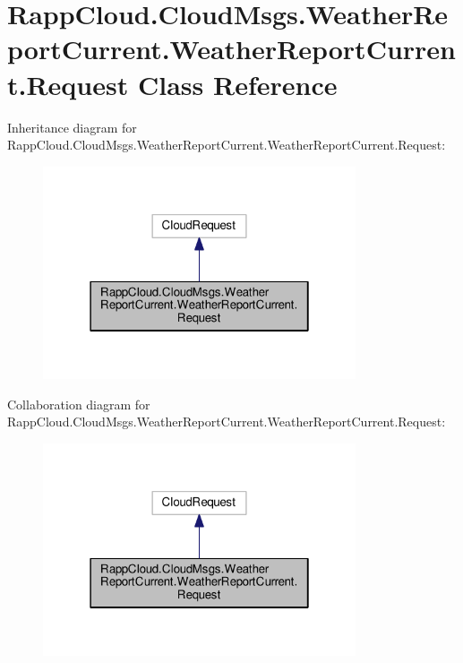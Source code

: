 \hypertarget{classRappCloud_1_1CloudMsgs_1_1WeatherReportCurrent_1_1WeatherReportCurrent_1_1Request}{\section{Rapp\-Cloud.\-Cloud\-Msgs.\-Weather\-Report\-Current.\-Weather\-Report\-Current.\-Request Class Reference}
\label{classRappCloud_1_1CloudMsgs_1_1WeatherReportCurrent_1_1WeatherReportCurrent_1_1Request}
}


Inheritance diagram for Rapp\-Cloud.\-Cloud\-Msgs.\-Weather\-Report\-Current.\-Weather\-Report\-Current.\-Request\-:
\nopagebreak
\begin{figure}[H]
\begin{center}
\leavevmode
\includegraphics[width=262pt]{classRappCloud_1_1CloudMsgs_1_1WeatherReportCurrent_1_1WeatherReportCurrent_1_1Request__inherit__graph}
\end{center}
\end{figure}


Collaboration diagram for Rapp\-Cloud.\-Cloud\-Msgs.\-Weather\-Report\-Current.\-Weather\-Report\-Current.\-Request\-:
\nopagebreak
\begin{figure}[H]
\begin{center}
\leavevmode
\includegraphics[width=262pt]{classRappCloud_1_1CloudMsgs_1_1WeatherReportCurrent_1_1WeatherReportCurrent_1_1Request__coll__graph}
\end{center}
\end{figure}
